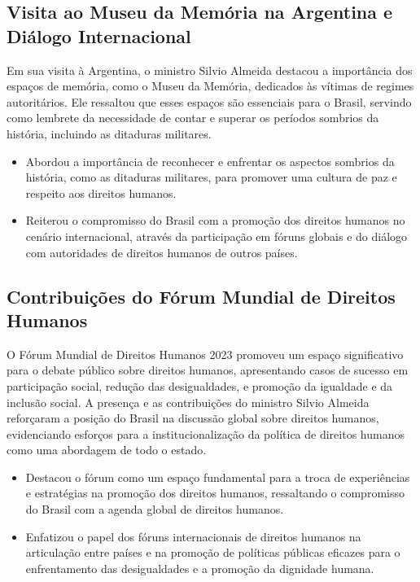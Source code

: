 \documentclass[
   article,       
   12pt,          
   oneside,       
   a4paper,       
   english,       
   brazil,        
   sumario=tradicional
   ]{abntex2}
\begin{document}
\subsection{Visita ao Museu da Memória na Argentina e Diálogo Internacional}

Em sua visita à Argentina, o ministro Silvio Almeida destacou a importância dos espaços de memória, como o Museu da Memória, dedicados às vítimas de regimes autoritários. Ele ressaltou que esses espaços são essenciais para o Brasil, servindo como lembrete da necessidade de contar e superar os períodos sombrios da história, incluindo as ditaduras militares.

\begin{itemize}
    \item Abordou a importância de reconhecer e enfrentar os aspectos sombrios da história, como as ditaduras militares, para promover uma cultura de paz e respeito aos direitos humanos.
    \item Reiterou o compromisso do Brasil com a promoção dos direitos humanos no cenário internacional, através da participação em fóruns globais e do diálogo com autoridades de direitos humanos de outros países.
\end{itemize}

\subsection{Contribuições do Fórum Mundial de Direitos Humanos}

O Fórum Mundial de Direitos Humanos 2023 promoveu um espaço significativo para o debate público sobre direitos humanos, apresentando casos de sucesso em participação social, redução das desigualdades, e promoção da igualdade e da inclusão social. A presença e as contribuições do ministro Silvio Almeida reforçaram a posição do Brasil na discussão global sobre direitos humanos, evidenciando esforços para a institucionalização da política de direitos humanos como uma abordagem de todo o estado.

\begin{itemize}
    \item Destacou o fórum como um espaço fundamental para a troca de experiências e estratégias na promoção dos direitos humanos, ressaltando o compromisso do Brasil com a agenda global de direitos humanos.
    \item Enfatizou o papel dos fóruns internacionais de direitos humanos na articulação entre países e na promoção de políticas públicas eficazes para o enfrentamento das desigualdades e a promoção da dignidade humana.
\end{itemize}
\end{document}
